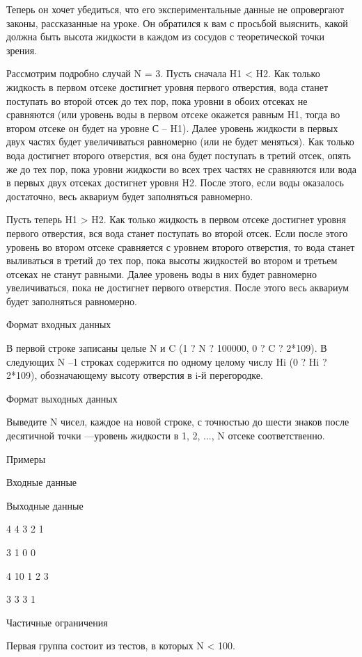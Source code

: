 \documentclass[]{article}
\begin{document}
\begin{enumerate}
Теперь он хочет убедиться, что его экспериментальные данные не опровергают законы, рассказанные на уроке. Он обратился к вам с просьбой выяснить, какой должна быть высота жидкости в каждом из сосудов с теоретической точки зрения.

Рассмотрим подробно случай N = 3. Пусть сначала H1 < H2. Как только жидкость в первом отсеке достигнет уровня первого отверстия, вода станет поступать во второй отсек до тех пор, пока уровни в обоих отсеках не сравняются (или уровень воды в первом отсеке окажется равным H1, тогда во втором отсеке он будет на уровне С – H1). Далее уровень жидкости в первых двух частях будет увеличиваться равномерно (или не будет меняться). Как только вода достигнет второго отверстия, вся она будет поступать в третий отсек, опять же до тех пор, пока уровни жидкости во всех трех частях не сравняются или вода в первых двух отсеках достигнет уровня H2. После этого, если воды оказалось достаточно, весь аквариум будет заполняться равномерно.

Пусть теперь H1 > H2. Как только жидкость в первом отсеке достигнет уровня первого отверстия, вся вода станет поступать во второй отсек. Если после этого уровень во втором отсеке сравняется с уровнем второго отверстия, то вода станет выливаться в третий до тех пор, пока высоты жидкостей во втором и третьем отсеках не станут равными. Далее уровень воды в них будет равномерно увеличиваться, пока не достигнет первого отверстия. После этого весь аквариум будет заполняться равномерно.

Формат входных данных

В первой строке записаны целые N и C (1 ? N ? 100000, 0 ? C ? 2*109). В следующих N –1 строках содержится по одному целому числу Hi (0 ? Hi ? 2*109), обозначающему высоту отверстия в i-й перегородке.

Формат выходных данных

Выведите N чисел, каждое на новой строке, с точностью до шести знаков после десятичной точки —уровень жидкости в 1, 2, ..., N отсеке соответственно.

Примеры

Входные данные
	

Выходные данные

4 4
3
2
1
	

3
1
0
0

4 10
1
2
3
	

3
3
3
1

Частичные ограничения

Первая группа состоит из тестов, в которых N < 100.


\end{enumerate}
\end{document}
